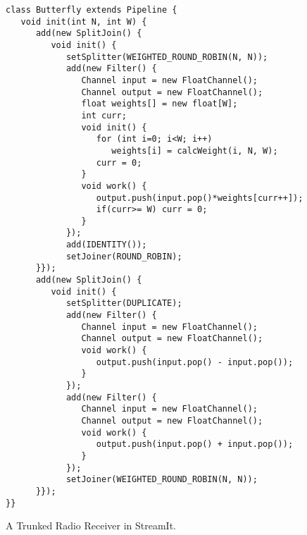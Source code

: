 \begin{figure}
\begin{verbatim}
class Butterfly extends Pipeline {
   void init(int N, int W) {
      add(new SplitJoin() {
         void init() {
            setSplitter(WEIGHTED_ROUND_ROBIN(N, N));
            add(new Filter() {
               Channel input = new FloatChannel();
               Channel output = new FloatChannel();
               float weights[] = new float[W];
               int curr;
               void init() {
                  for (int i=0; i<W; i++)
                     weights[i] = calcWeight(i, N, W);
                  curr = 0;
               }
               void work() {
                  output.push(input.pop()*weights[curr++]);
                  if(curr>= W) curr = 0;
               }    
            });
            add(IDENTITY());
            setJoiner(ROUND_ROBIN);
      }});
      add(new SplitJoin() {
         void init() {
            setSplitter(DUPLICATE);
            add(new Filter() {   
               Channel input = new FloatChannel();
               Channel output = new FloatChannel();
               void work() {
                  output.push(input.pop() - input.pop());
               }
            });
            add(new Filter() {   
               Channel input = new FloatChannel();
               Channel output = new FloatChannel();
               void work() {
                  output.push(input.pop() + input.pop());
               }
            });
            setJoiner(WEIGHTED_ROUND_ROBIN(N, N));
      }});
}}
\end{verbatim}
\vspace{-6pt}
\caption{\protect\small A Trunked Radio Receiver in StreamIt.
\protect\label{fig:radiocode}}
\vspace{-12pt}
\end{figure}

